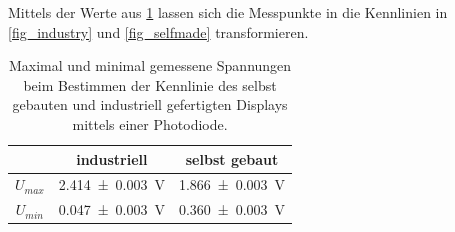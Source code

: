 \documentclass[
	a4paper,
	12pt,
	pagesize,
	ngerman
]{scrartcl}
\begin{document}
	Mittels der Werte aus \cref{tb_maxmin} lassen sich die Messpunkte in die Kennlinien in \cref{fig_industry} und \cref{fig_selfmade} transformieren.
\begin{table}[H]
		\centering
		\begin{tabular}{ c | c | c }
			 & industriell & selbst gebaut \\ \hline
			$U_{max}$ & \SI{2.414+-0.003}{V} & \SI{1.866+-0.003}{V} \\
			$U_{min}$ & \SI{0.047+-0.003}{V} & \SI{0.360+-0.003}{V} \\
		\end{tabular}
		\caption{Maximal und minimal gemessene Spannungen beim Bestimmen der Kennlinie des selbst gebauten und industriell gefertigten Displays mittels einer Photodiode.}
		\label{tb_maxmin}
\end{table}
\end{document}
